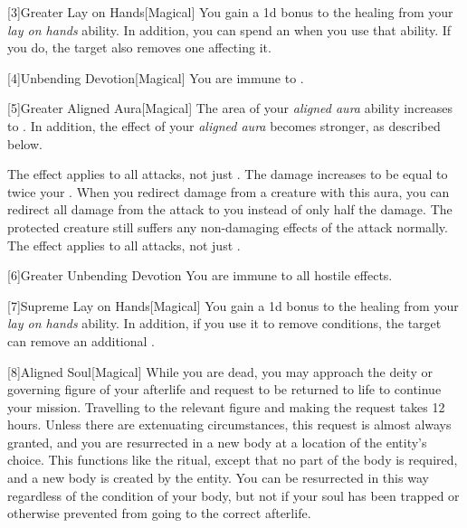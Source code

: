         [3]{Greater Lay on Hands}[Magical]
        You gain a \plus1d bonus to the healing from your \textit{lay on hands} ability.
        In addition, you can spend an  when you use that ability.
        If you do, the target also removes one  affecting it.

        [4]{Unbending Devotion}[Magical]
        You are immune to  .

        [5]{Greater Aligned Aura}[Magical]
        The area of your \textit{aligned aura} ability increases to \arealarge.
        In addition, the effect of your \textit{aligned aura} becomes stronger, as described below.

         The effect applies to all attacks, not just .
         The damage increases to be equal to twice your .
         When you redirect damage from a creature with this aura, you can redirect all damage from the attack to you instead of only half the damage.
        The protected creature still suffers any non-damaging effects of the attack normally.
         The effect applies to all attacks, not just .

        [6]{Greater Unbending Devotion}
        You are immune to all hostile  effects.

        [7]{Supreme Lay on Hands}[Magical]
        You gain a \plus1d bonus to the healing from your \textit{lay on hands} ability.
        In addition, if you use it to remove conditions, the target can remove an additional .

        [8]{Aligned Soul}[Magical]
        While you are dead, you may approach the deity or governing figure of your afterlife and request to be returned to life to continue your mission.
        Travelling to the relevant figure and making the request takes 12 hours.
        Unless there are extenuating circumstances, this request is almost always granted, and you are resurrected in a new body at a location of the entity's choice.
        This functions like the  ritual, except that no part of the body is required, and a new body is created by the entity.
        You can be resurrected in this way regardless of the condition of your body, but not if your soul has been trapped or otherwise prevented from going to the correct afterlife.

